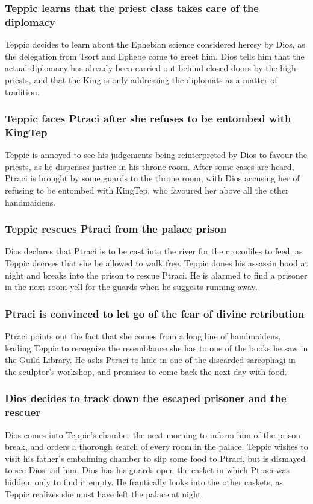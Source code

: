 \subsubsection{\Gls{Teppic} learns that the priest class takes care of the diplomacy}
\Gls{Teppic} decides to learn about the Ephebian science considered heresy by \Gls{Dios}, as the
delegation from Tsort and Ephebe come to greet him. \Gls{Dios} tells him that the actual diplomacy
has already been carried out behind closed doors by the high priests, and that the King is only
addressing the diplomats as a matter of tradition.

\subsubsection{\Gls{Teppic} faces \Gls{Ptraci} after she refuses to be entombed with \Gls{KingTep}}
\Gls{Teppic} is annoyed to see his judgements being reinterpreted by \Gls{Dios} to favour the
priests, as he dispenses justice in his throne room. After some cases are heard, \Gls{Ptraci} is
brought by some guards to the throne room, with \Gls{Dios} accusing her of refusing to be entombed
with \Gls{KingTep}, who favoured her above all the other handmaidens.

\subsubsection{\Gls{Teppic} rescues \Gls{Ptraci} from the palace prison}
\Gls{Dios} declares that \Gls{Ptraci} is to be cast into the river for the crocodiles to feed, as
\Gls{Teppic} decrees that she be allowed to walk free. \Gls{Teppic} dones his assassin hood at night
and breaks into the prison to rescue \Gls{Ptraci}. He is alarmed to find a prisoner in the next room
yell for the guards when he suggests running away.

\subsubsection{\Gls{Ptraci} is convinced to let go of the fear of divine retribution}
\Gls{Ptraci} points out the fact that she comes from a long line of handmaidens, leading
\Gls{Teppic} to recognize the resemblance she has to one of the books he saw in the Guild Library.
He asks \Gls{Ptraci} to hide in one of the discarded sarcophagi in the sculptor's workshop, and
promises to come back the next day with food.

\subsubsection{\Gls{Dios} decides to track down the escaped prisoner and the rescuer}
\Gls{Dios} comes into \Gls{Teppic}'s chamber the next morning to inform him of the prison break,
and orders a thorough search of every room in the palace. \Gls{Teppic} wishes to visit his father's
embalming chamber to slip some food to \Gls{Ptraci}, but is dismayed to see \Gls{Dios} tail him.
\Gls{Dios} has his guards open the casket in which \Gls{Ptraci} was hidden, only to find it empty.
He frantically looks into the other caskets, as \Gls{Teppic} realizes she must have left the palace
at night.

